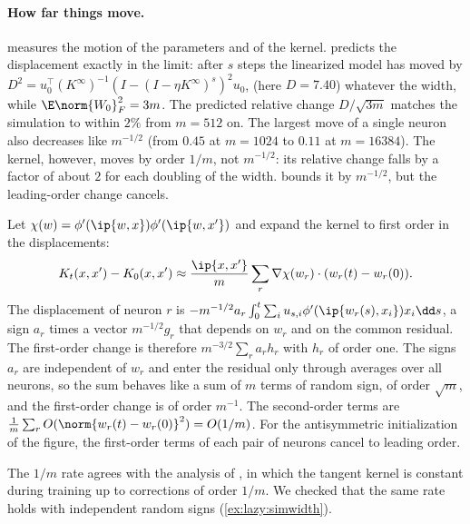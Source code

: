 \begin{refsection}
\paragraph{How far things move.}  measures the motion of the parameters and of the kernel.  predicts the displacement exactly in the limit: after $s$ steps the linearized model has moved by $D^2=u_0^\top(K^\infty)^{-1}(I-(I-\eta K^\infty)^s)^2u_0$, (here $D=7.40$) whatever the width, while $\E\norm{W_0}_F^2=3m$. The predicted relative change $D/\sqrt{3m}$ matches the simulation to within $2\%$ from $m=512$ on. The largest move of a single neuron also decreases like $m^{-1/2}$ (from $0.45$ at $m=1024$ to $0.11$ at $m=16384$). The kernel, however, moves by order $1/m$, not $m^{-1/2}$: its relative change falls by a factor of about $2$ for each doubling of the width.  bounds it by $m^{-1/2}$, but the leading-order change cancels.

\begin{heuristic}
Let $\chi(w)=\phi'(\ip{w,x})\phi'(\ip{w,x'})$ and expand the kernel to first order in the displacements:
\[
  K_t(x,x')-K_0(x,x')\approx\frac{\ip{x,x'}}m\sum_r\nabla\chi(w_r)\cdot(w_r(t)-w_r(0)).
\] The displacement of neuron $r$ is $-m^{-1/2}a_r\int_0^t\sum_iu_{s,i}\phi'(\ip{w_r(s),x_i})x_i\dd s$, a sign $a_r$ times a vector $m^{-1/2}g_r$ that depends on $w_r$ and on the common residual. The first-order change is therefore $m^{-3/2}\sum_ra_rh_r$ with $h_r$ of order one. The signs $a_r$ are independent of $w_r$ and enter the residual only through averages over all neurons, so the sum behaves like a sum of $m$ terms of random sign, of order $\sqrt m$, and the first-order change is of order $m^{-1}$. The second-order terms are $\frac1m\sum_rO(\norm{w_r(t)-w_r(0)}^2)=O(1/m)$. For the antisymmetric initialization of the figure, the first-order terms of each pair of neurons cancel to leading order.
\end{heuristic}

The $1/m$ rate agrees with the analysis of \textcite{DyerGurAri2020}, in which the tangent kernel is constant during training up to corrections of order $1/m$. We checked that the same rate holds with independent random signs (\cref{ex:lazy:simwidth}).


\end{refsection}
